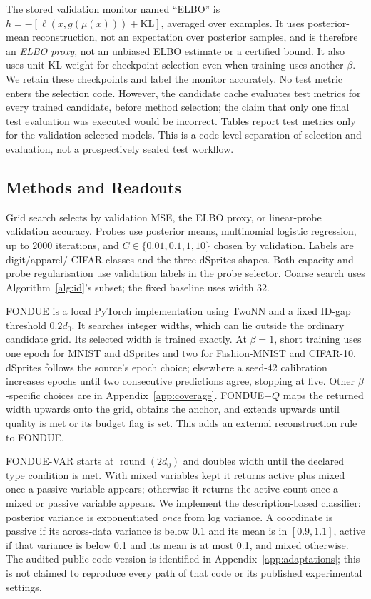 The stored validation monitor named ``ELBO'' is
$h=-[\ell(x,g(\mu(x)))+\mathrm{KL}]$, averaged over examples. It uses
posterior-mean reconstruction, not an expectation over posterior samples,
and is therefore an \emph{ELBO proxy}, not an unbiased ELBO estimate or a
certified bound. It also uses unit KL weight for checkpoint selection
even when training uses another $\beta$. We retain these checkpoints and
label the monitor accurately. No test metric enters the selection code.
However, the candidate cache evaluates test metrics for every trained
candidate, before method selection; the claim that only one final test
evaluation was executed would be incorrect. Tables report test metrics
only for the validation-selected models. This is a code-level separation
of selection and evaluation, not a prospectively sealed test workflow.

\subsection{Methods and Readouts}\label{sec:methods}
Grid search selects by validation MSE, the ELBO proxy, or linear-probe
validation accuracy. Probes use posterior means, multinomial logistic
regression, up to 2000 iterations, and
$C\in\{0.01,0.1,1,10\}$ chosen by validation. Labels are digit/apparel/
CIFAR classes and the three dSprites shapes. Both capacity and probe
regularisation use validation labels in the probe selector. Coarse search
uses Algorithm~\ref{alg:id}'s subset; the fixed baseline uses width 32.

FONDUE is a local PyTorch implementation using TwoNN and a fixed
ID-gap threshold $0.2d_0$. It searches integer widths, which can lie
outside the ordinary candidate grid. Its selected width is trained
exactly. At $\beta=1$, short training uses one epoch for MNIST and
dSprites and two for Fashion-MNIST and CIFAR-10. dSprites follows the
source's epoch choice; elsewhere a seed-42 calibration increases epochs
until two consecutive predictions agree, stopping at five. Other
$\beta$-specific choices are in Appendix~\ref{app:coverage}.
FONDUE+$Q$ maps the returned width upwards onto the grid, obtains the
anchor, and extends upwards until quality is met or its budget flag is
set. This adds an external reconstruction rule to FONDUE.

FONDUE-VAR starts at $\operatorname{round}(2d_0)$ and doubles width until
the declared type condition is met. With mixed variables kept it returns
active plus mixed once a passive variable appears; otherwise it returns
the active count once a mixed or passive variable appears. We implement
the description-based classifier: posterior variance is exponentiated
\emph{once} from log variance. A coordinate is passive if its across-data
variance is below 0.1 and its mean is in $[0.9,1.1]$, active if that
variance is below 0.1 and its mean is at most 0.1, and mixed otherwise.
The audited public-code version is identified in
Appendix~\ref{app:adaptations}; this is not claimed to reproduce every
path of that code or its published experimental settings.

